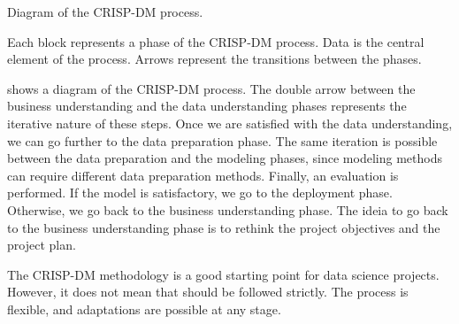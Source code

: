 \begin{figurebox}[label=fig:cripdm]{Diagram of the CRISP-DM process.}
  \centering
  \tcblower
  Each block represents a phase of the CRISP-DM process.  Data is the central element of
  the process.  Arrows represent the transitions between the phases.
\end{figurebox}

 shows a diagram of the CRISP-DM process.  The double arrow between the
business understanding and the data understanding phases represents the iterative nature
of these steps.  Once we are satisfied with the data understanding, we can go further to
the data preparation phase.  The same iteration is possible between the data preparation
and the modeling phases, since modeling methods can require different data preparation
methods. Finally, an evaluation is performed.  If the model is satisfactory, we go to the
deployment phase.  Otherwise, we go back to the business understanding phase.  The ideia
to go back to the business understanding phase is to rethink the project objectives and
the project plan.

The CRISP-DM methodology is a good starting point for data science projects.  However, it
does not mean that should be followed strictly.  The process is flexible, and
adaptations are possible at any stage.

